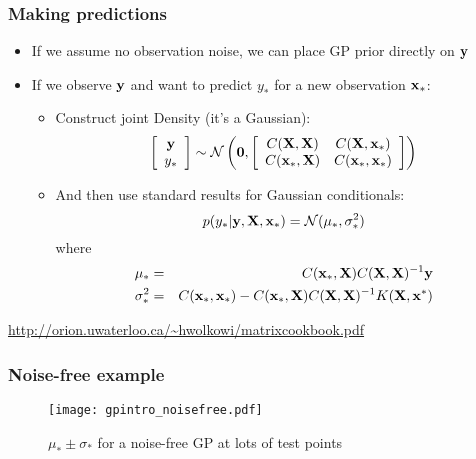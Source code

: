 \begin{frame}
	\frametitle{Making predictions}
	\begin{itemize}
		\item If we assume no observation noise, we can place \ac{GP} prior directly on $\mathbf{y}$
		\item If we observe $\mathbf{y}$ and want to predict $y_*$ for a new observation $\mathbf{x}_*$:
		\begin{itemize}
			\item Construct joint Density (it's a Gaussian):
			\[
				\left[
					\begin{array}{c}
						\mathbf{y} \\ y_*
					\end{array}
				\right]
				\sim 
				{\cal N} 	\left (
								\mathbf{0} , 
								\left [
									\begin{array}{cc}
											C(\mathbf{X},\mathbf{X}) & C(\mathbf{X},\mathbf{x}_*) \\ 
											C(\mathbf{x}_*,\mathbf{X}) & C(\mathbf{x}_*,\mathbf{x}_*)
									\end{array}
								\right ]
							\right )
			\]
			\item And then use standard results for Gaussian conditionals:
			\[
				p(y_*|\mathbf{y},\mathbf{X},\mathbf{x}_*) = {\cal N}(\mu_*,\sigma^2_*)
			\]
			where
			\begin{eqnarray}
				\nonumber \mu_* &=& C(\mathbf{x}_*,\mathbf{X})C(\mathbf{X},\mathbf{X})^{-1}\mathbf{y}\\
				\nonumber \sigma^2_* &=& C(\mathbf{x}_*,\mathbf{x}_*) - C(\mathbf{x}_*,\mathbf{X})C(\mathbf{X},\mathbf{X})^{-1}K(\mathbf{X},\mathbf{x}^*)
			\end{eqnarray}
		\end{itemize}
	\end{itemize}
	{\small \url{http://orion.uwaterloo.ca/~hwolkowi/matrixcookbook.pdf}}
\end{frame}

\begin{frame}
	\frametitle{Noise-free example}
	\begin{figure}[tbh]
		\centering\texttt{[image: gpintro\_noisefree.pdf]}
		\centering\caption{\label{fig:gpintro_noisefree}$\mu_*\pm \sigma_*$ for a noise-free GP at lots of test points}
	\end{figure}
\end{frame}

